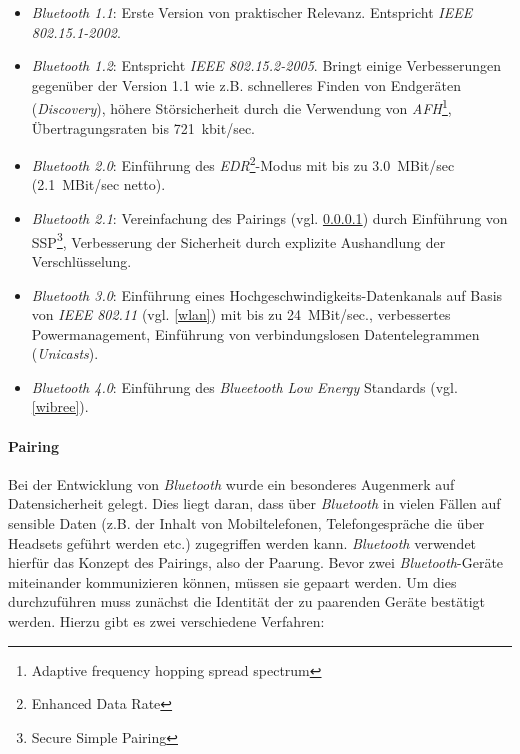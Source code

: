                 \begin{itemize}
                    \item{\emph{Bluetooth 1.1}:} Erste Version von praktischer Relevanz. Entspricht 
                                          \emph{IEEE 802.15.1-2002}.
                    \item{\emph{Bluetooth 1.2}:} Entspricht \emph{IEEE 802.15.2-2005}. Bringt einige Verbesserungen
                                          gegenüber der Version 1.1 wie z.B. schnelleres Finden
                                          von Endgeräten (\emph{Discovery}), höhere Störsicherheit durch
                                          die Verwendung von \emph{AFH}\footnote{Adaptive frequency hopping spread spectrum},
                                          Übertragungsraten bis 721~kbit/sec.
                    \item{\emph{Bluetooth 2.0}:} Einführung des \emph{EDR}\footnote{Enhanced Data Rate}-Modus mit bis zu
                                          3.0~MBit/sec (2.1~MBit/sec netto).
                    \item{\emph{Bluetooth 2.1}:} Vereinfachung des Pairings (vgl. \ref{BluetoothPairing}) durch 
                                          Einführung von SSP\footnote{Secure Simple Pairing}, Verbesserung
                                          der Sicherheit durch explizite Aushandlung der Verschlüsselung.
                    \item{\emph{Bluetooth 3.0}:} Einführung eines Hochgeschwindigkeits-Datenkanals auf Basis von
                                          \emph{IEEE 802.11} (vgl. \ref{wlan}) mit bis zu 24~MBit/sec., verbessertes
                                          Powermanagement, Einführung von verbindungslosen Datentelegrammen
                                          (\emph{Unicasts}).
                    \item{\emph{Bluetooth 4.0}:} Einführung des \textsl{Blueetooth Low Energy} Standards (vgl. \ref{wibree}).
                \end{itemize}

            \paragraph{Pairing}\label{BluetoothPairing}
                Bei der Entwicklung von \emph{Bluetooth} wurde ein besonderes Augenmerk auf Datensicherheit gelegt. 
                Dies liegt daran, dass über \emph{Bluetooth} in vielen Fällen auf sensible Daten (z.B. der Inhalt
                von Mobiltelefonen, Telefongespräche die über Headsets geführt werden etc.) zugegriffen
                werden kann. \emph{Bluetooth} verwendet hierfür das Konzept des Pairings, also der Paarung. Bevor zwei 
                \emph{Bluetooth}-Geräte miteinander kommunizieren können, müssen sie gepaart werden. Um dies 
                durchzuführen muss zunächst die Identität der zu paarenden Geräte bestätigt werden.
                Hierzu gibt es zwei verschiedene Verfahren:

